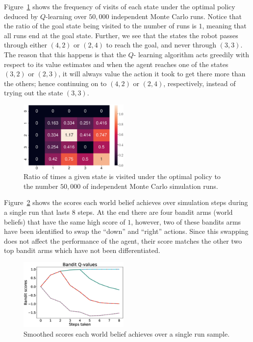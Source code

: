 Figure~\ref{fig:visit_count} shows the frequency of visits of each state under
the optimal policy deduced by $Q$-learning over $50,000$ independent Monte Carlo
runs. Notice that the ratio of the goal state being visited to the number of
runs is $1$, meaning that all runs end at the goal state. Further, we see that
the states the robot passes through either $(4, 2)$ or $(2, 4)$ to reach the
goal, and never through $(3, 3)$. The reason that this happens is that the $Q$-
learning algorithm acts greedily with respect to its value estimates and when 
the agent reaches one of the states $(3, 2)$ or $(2, 3)$, it will always value 
the action it took to get there more than the others; hence continuing on to 
$(4, 2)$ or $(2, 4)$, respectively, instead of trying out the state $(3, 3)$.
%
\begin{figure}[tb]
    \centering
    \includegraphics[width=0.48\textwidth]{./figures/visit_count_ratio.eps}
    \caption{Ratio of times a given state is visited under the optimal policy to the number $50,000$ of independent Monte Carlo simulation runs.}
    \label{fig:visit_count}
\end{figure}

Figure~\ref{fig:bandit_scores} shows the scores each world belief achieves over
simulation steps during a single run that lasts $8$ steps. At the end there are
four bandit arms (world beliefs) that have the same high score of $1$, however,
two of these bandits arms have been identified to swap the ``down'' and
``right'' actions. Since this swapping does not affect the performance of the
agent, their score matches the other two top bandit arms which have not been
differentiated.
%
\begin{figure}[bt]
    \centering
    \includegraphics[width=0.48\textwidth]{./figures/bandit_scores.eps}
    \caption{Smoothed scores each world belief achieves over a single run sample.}
    \label{fig:bandit_scores}
\end{figure}